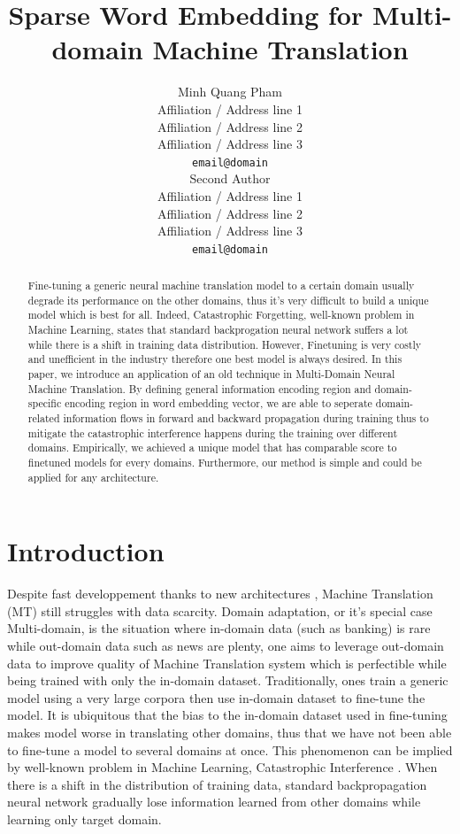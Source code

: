 \documentclass[11pt,a4paper]{article}
\title{Sparse Word Embedding for Multi-domain Machine Translation}
\author{Minh Quang Pham\\
  Affiliation / Address line 1 \\
  Affiliation / Address line 2 \\
  Affiliation / Address line 3 \\
  {\tt email@domain} \\\And
  Second Author \\
  Affiliation / Address line 1 \\
  Affiliation / Address line 2 \\
  Affiliation / Address line 3 \\
  {\tt email@domain} \\}
\date{}
\newcommand{\fyTodo}[1]{\Todo[FY>]{\textcolor{orange}{#1}}}
\begin{document}
\maketitle

\fyTodo{Too long, selfcontained, noref, rewrite}
\begin{abstract}
Fine-tuning a generic neural machine translation model to a certain domain usually degrade its performance on the other domains, thus it's very difficult to build a unique model which is best for all. Indeed, Catastrophic Forgetting, well-known problem in Machine Learning, states that standard backprogation neural network suffers a lot while there is a shift in training data distribution. However, Finetuning is very costly and unefficient in the industry therefore one best model is always desired. In this paper, we introduce an application of an old technique \cite{P07-1033} in Multi-Domain Neural Machine Translation. By defining general information encoding region and domain-specific encoding region in word embedding vector, we are able to seperate domain-related information flows in forward and backward propagation during training thus to
mitigate the catastrophic interference happens during the training over different domains. Empirically, we achieved a unique model that has comparable score to finetuned models for every domains. Furthermore, our method is simple and could be applied for any architecture.
\end{abstract}

\section{Introduction}
\fyTodo{Merge refs and order chronologically} \fyTodo{Homogeneize cite keys, avoid arxiv}
Despite fast developpement thanks to new architectures \cite{D13-1176, Sutskever2014Sequence, bahdanau2014neural, NIPS2017_7181}, Machine Translation (MT) still struggles with data scarcity. Domain adaptation, or it's special case Multi-domain, is the situation where in-domain data (such as banking) is rare while out-domain data such as news are plenty, one aims to leverage out-domain data to improve quality of Machine Translation system which is perfectible while being trained with only the in-domain dataset. Traditionally, ones train a generic model using a very large corpora then use in-domain dataset to fine-tune the model. It is ubiquitous that the bias to the in-domain dataset used in fine-tuning makes model worse in translating other domains, thus that we have not been able to fine-tune a model to several domains at once. This phenomenon can be implied by well-known problem in Machine Learning, Catastrophic Interference \cite{Michael1989Catastrophic}. When there is a shift in the distribution of training data, standard backpropagation neural network\fyTodo{Generic ? backprop or NN problem ?} gradually lose information learned from other domains while learning only target domain.
\end{document}
